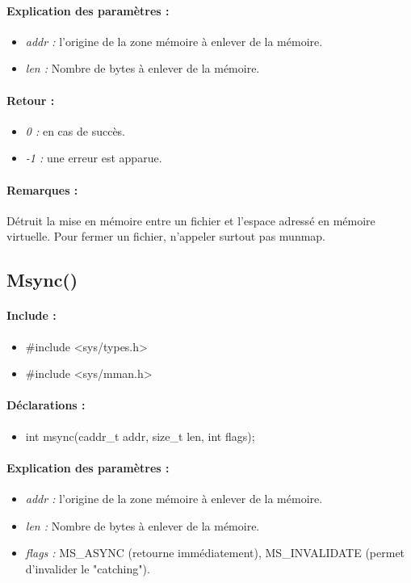 \documentclass{article}[12pt]
\begin{document}
\paragraph{Explication des paramètres : }
\begin{itemize}
	\item \emph{addr : } l'origine de la zone mémoire à enlever de la mémoire.
	\item \emph{len : } Nombre de bytes à enlever de la mémoire.
\end{itemize}
\paragraph{Retour : }
\begin{itemize}
	\item \emph{0 : } en cas de succès.
	\item \emph{-1 : } une erreur est apparue.
\end{itemize}
\paragraph{Remarques : }
Détruit la mise en mémoire entre un fichier et l'espace adressé en mémoire virtuelle. Pour fermer un fichier, n'appeler surtout pas munmap. 
\subsection{Msync()}
\paragraph{Include : }
\begin{itemize}
	\item \#include <sys/types.h>
	\item \#include <sys/mman.h>
\end{itemize}
\paragraph{Déclarations : }
\begin{itemize}
	\item int msync(caddr\_t addr, size\_t len, int flags);
\end{itemize}
\paragraph{Explication des paramètres : }
\begin{itemize}
	\item \emph{addr : } l'origine de la zone mémoire à enlever de la mémoire.
	\item \emph{len : } Nombre de bytes à enlever de la mémoire.
	\item \emph{flags : } MS\_ASYNC (retourne immédiatement), MS\_INVALIDATE (permet d'invalider le "catching").
\end{itemize}
\end{document}
